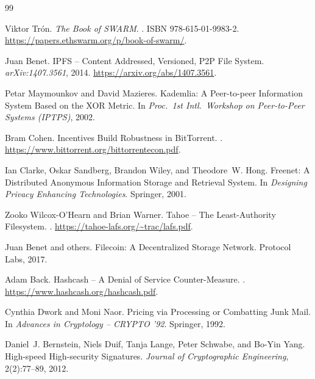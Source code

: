 \documentclass[11pt]{article}
\begin{document}
\begin{thebibliography}{99}

Viktor Tr\'on.
\newblock \emph{The Book of {SWARM}}.
.
\newblock ISBN 978-615-01-9983-2.
\newblock \url{https://papers.ethswarm.org/p/book-of-swarm/}.

Juan Benet.
\newblock IPFS -- Content Addressed, Versioned, {P2P} File System.
\newblock \emph{arXiv:1407.3561}, 2014.
\newblock \url{https://arxiv.org/abs/1407.3561}.

Petar Maymounkov and David Mazieres.
\newblock Kademlia: A Peer-to-peer Information System Based on the XOR Metric.
\newblock In \emph{Proc.\ 1st Intl.\ Workshop on Peer-to-Peer Systems
  (IPTPS)}, 2002.

Bram Cohen.
\newblock Incentives Build Robustness in {BitTorrent}.
.
\newblock \url{https://www.bittorrent.org/bittorrentecon.pdf}.

Ian Clarke, Oskar Sandberg, Brandon Wiley, and Theodore~W. Hong.
\newblock Freenet: A Distributed Anonymous Information Storage and Retrieval
  System.
\newblock In \emph{Designing Privacy Enhancing Technologies}. Springer, 2001.

Zooko Wilcox-O'Hearn and Brian Warner.
\newblock Tahoe -- The Least-Authority Filesystem.
.
\newblock \url{https://tahoe-lafs.org/~trac/lafs.pdf}.

Juan Benet and others.
\newblock Filecoin: A Decentralized Storage Network.
\newblock Protocol Labs, 2017.

Adam Back.
\newblock Hashcash -- A Denial of Service Counter-Measure.
.
\newblock \url{https://www.hashcash.org/hashcash.pdf}.

Cynthia Dwork and Moni Naor.
\newblock Pricing via Processing or Combatting Junk Mail.
\newblock In \emph{Advances in Cryptology -- {CRYPTO} '92}. Springer, 1992.

Daniel~J. Bernstein, Niels Duif, Tanja Lange, Peter Schwabe, and Bo-Yin Yang.
\newblock High-speed High-security Signatures.
\newblock \emph{Journal of Cryptographic Engineering}, 2(2):77--89, 2012.


\end{thebibliography}
\end{document}
